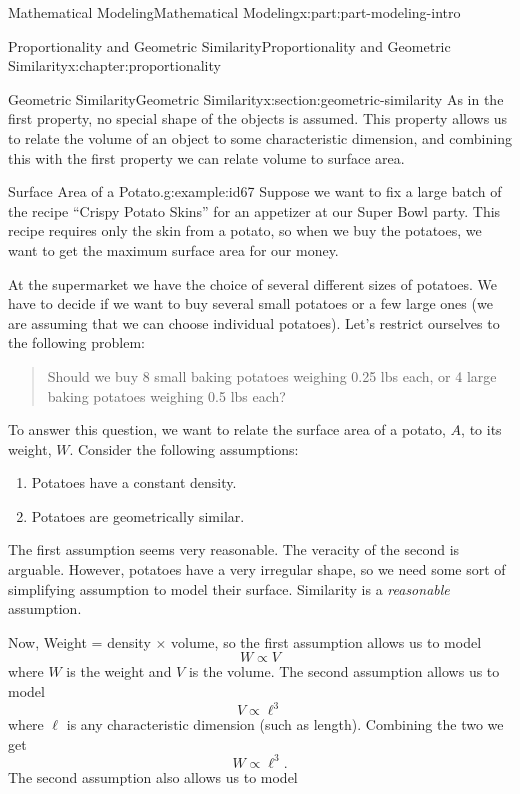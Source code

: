 \documentclass[oneside,10pt,]{book}
\numberwithin{equation}{section}
\begin{document}
\begin{partptx}{Mathematical Modeling}{}{Mathematical Modeling}{}{}{x:part:part-modeling-intro}
\begin{chapterptx}{Proportionality and Geometric Similarity}{}{Proportionality and Geometric Similarity}{}{}{x:chapter:proportionality}
\begin{sectionptx}{Geometric Similarity}{}{Geometric Similarity}{}{}{x:section:geometric-similarity}
As in the first property, no special shape of the objects is assumed. This property allows us to relate the volume of an object to some characteristic dimension, and combining this with the first property we can relate volume to surface area.%
\begin{example}{Surface Area of a Potato.}{g:example:id67}%
Suppose we want to fix a large batch of the recipe ``Crispy Potato Skins'' for an appetizer at our Super Bowl party. This recipe requires only the skin from a potato, so when we buy the potatoes, we want to get the maximum surface area for our money.%
\par
At the supermarket we have the choice of several different sizes of potatoes. We have to decide if we want to buy several small potatoes or a few large ones (we are assuming that we can choose individual potatoes). Let’s restrict ourselves to the following problem:%
\begin{quote}%
Should we buy 8 small baking potatoes weighing 0.25 lbs each, or 4 large baking potatoes weighing 0.5 lbs each?%
\end{quote}
To answer this question, we want to relate the surface area of a potato, \(A\), to its weight, \(W\). Consider the following assumptions:%
%
\begin{enumerate}
\item{}Potatoes have a constant density.%
\item{}Potatoes are geometrically similar.%
\end{enumerate}
The first assumption seems very reasonable. The veracity of the second is arguable. However, potatoes have a very irregular shape, so we need some sort of simplifying assumption to model their surface. Similarity is a \emph{reasonable} assumption.%
\par
Now, Weight = density \(\times\) volume, so the first assumption allows us to model%
%
\begin{equation*}
W\propto V
\end{equation*}
where \(W\) is the weight and \(V\) is the volume. The second assumption allows us to model%
%
\begin{equation*}
V\propto \ell^3
\end{equation*}
where \(\ell\) is any characteristic dimension (such as length). Combining the two we get%
%
\begin{equation}
W\propto\ell^3.\label{x:men:weight-eqn}
\end{equation}
The second assumption also allows us to model%
%
\begin{equation*}

\end{equation*}
\end{example}
\end{sectionptx}
\end{chapterptx}
\end{partptx}
\end{document}
